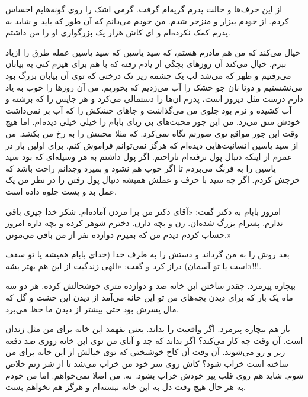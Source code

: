 \documentclass[12pt,a4paper]{book}
\begin{document}
از این حرف‌ها و حالت پدرم گریه‌ام گرفت. گرمی اشک را روی گونه‌هایم احساس کردم. از خودم بیزار و منزجر شدم. من خودم می‌دانم که آن طور که باید و شاید به پدرم کمک نکرده‌ام و ای کاش هزار یک بزرگواری او را من داشتم.

خیال می‌کند که من هم مادرم هستم، که سید یاسین که سید یاسین عمله طرق را ازیاد ببرم. خیال می‌کند آن روزهای بچگی از یادم رفته که با هم برای هیزم کنی به بیابان می‌رفتیم و ظهر که می‌شد لب یک چشمه زیر تک درختی که توی آن بیابان بزرگ بود می‌نشستیم و دوتا نان جو خشک را آب می‌زدیم که بخوریم. من آن روزها را خوب به یاد دارم درست مثل دیروز است، پدرم ان‌ها را دستمالی می‌کرد و هر جایس را که برشته و آب کشیده و نرم بود جلوی من می‌گذاشت و جاهای خشکش را که آب بر نمی‌داشت خودش سق می‌زد. من این جور محبت‌های بی ریای بابام را خیلی خیلی دیده‌ام. اما هیچ وقت این جور مواقع توی صورتم نگاه نمی‌کرد. که مثلا محبتش را به رخ من بکشد. من از سید یاسین انسانیت‌هایی دیده‌ام که هرگز نمی‌توانم فراموش کنم. برای اولین بار در عمرم از اینکه دنبال پول نرفته‌ام ناراحتم. اگر پول داشتم به هر وسیله‌ای که بود سید یاسین را به فرنگ می‌بردم تا اگر خوب هم نشود و بمیرد وجدانم راحت باشد که خرجش کردم. اگر چه سید با حرف و عملش همیشه دنبال پول رفتن را در نظر من یک عمل بد و پست جلوه داده است.

امروز بابام به دکتر گفت: «آقای دکتر من برا مردن آماده‌ام. شکر خدا چیزی باقی ندارم. پسرام بزرگ شده‌ان. زن و بچه دارن. دخترم شوهر کرده و بچه داره امروز حساب کردم دیدم من که بمیرم دوازده نفر از من باقی می‌مونن.»

بعد روش را به من گرداند و دستش را به طرف خدا (خدای بابام همیشه یا تو سقف است یا تو آسمان) دراز کرد و گفت: «الهی زندگیت از این هم بهتر بشه»!!!.

بیچاره پیرمرد. چقدر ساختن این خانه صد و دوازده متری خوشحالش کرده. هر دو سه ماه یک بار که برای دیدن بچه‌های من تو این خانه می‌آمد از دیدن این خشت و گل که مال پسرش بود حتی بیشتر از دیدن ما حظ می‌برد.

باز هم بیچاره پیرمرد. اگر واقعیت را بداند. یعنی بفهمد این خانه برای من مثل زندان است. آن وقت چه کار می‌کند؟ اگر بداند که جد و آبای من توی این خانه روزی صد دفعه زیر و رو می‌شوند. آن وقت آن کاخ خوشبختی که توی خیالش از این خانه برای من ساخته است خراب شود؟ کاش روی سر خود من خراب می‌شد تا از شر زنم خلاص شوم. شاید هم روی قلب پیر خودش خراب بشود. نه. من اصلا نمی‌خواهم. اما من خودم به هر حال هیچ وقت دل به این خانه نبسته‌ام و هرگز هم نخواهم بست.
\end{document}
